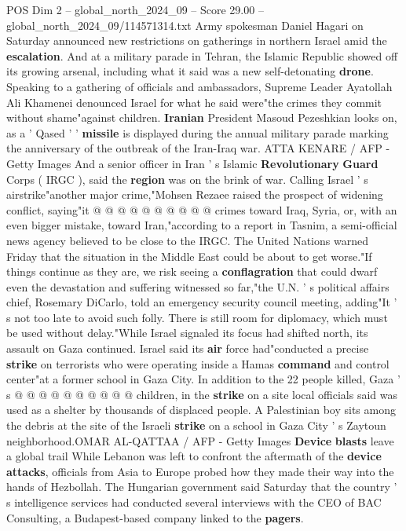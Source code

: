 \begin{textsample}{POS Dim 2 – global\_north\_2024\_09 – Score 29.00 – global\_north\_2024\_09/114571314.txt}
Army spokesman Daniel Hagari on Saturday announced new restrictions on gatherings in northern Israel amid the \textbf{escalation}.
And at a military parade in Tehran, the Islamic Republic showed off its growing arsenal, including what it said was a new self-detonating \textbf{drone}.
Speaking to a gathering of officials and ambassadors, Supreme Leader Ayatollah Ali Khamenei denounced Israel for what he said were"the crimes they commit without shame"against children. \textbf{Iranian} President Masoud Pezeshkian looks on, as a ' Qased ' ' \textbf{missile} is displayed during the annual military parade marking the anniversary of the outbreak of the Iran-Iraq war.
ATTA KENARE / AFP - Getty Images And a senior officer in Iran ' s Islamic \textbf{Revolutionary} \textbf{Guard} Corps ( IRGC ), said the \textbf{region} was on the brink of war.
Calling Israel ' s airstrike"another major crime,"Mohsen Rezaee raised the prospect of widening conflict, saying"it @ @ @ @ @ @ @ @ @ @ crimes toward Iraq, Syria, or, with an even bigger mistake, toward Iran,"according to a report in Tasnim, a semi-official news agency believed to be close to the IRGC.
The United Nations warned Friday that the situation in the Middle East could be about to get worse."If things continue as they are, we risk seeing a \textbf{conflagration} that could dwarf even the devastation and suffering witnessed so far,"the U.N. ' s political affairs chief, Rosemary DiCarlo, told an emergency security council meeting, adding"It ' s not too late to avoid such folly.
There is still room for diplomacy, which must be used without delay."While Israel signaled its focus had shifted north, its assault on Gaza continued.
Israel said its \textbf{air} force had"conducted a precise \textbf{strike} on terrorists who were operating inside a Hamas \textbf{command} and control center"at a former school in Gaza City.
In addition to the 22 people killed, Gaza ' s @ @ @ @ @ @ @ @ @ @ children, in the \textbf{strike} on a site local officials said was used as a shelter by thousands of displaced people.
A Palestinian boy sits among the debris at the site of the Israeli \textbf{strike} on a school in Gaza City ' s Zaytoun neighborhood.OMAR AL-QATTAA / AFP - Getty Images \textbf{Device} \textbf{blasts} leave a global trail While Lebanon was left to confront the aftermath of the \textbf{device} \textbf{attacks}, officials from Asia to Europe probed how they made their way into the hands of Hezbollah.
The Hungarian government said Saturday that the country ' s intelligence services had conducted several interviews with the CEO of BAC Consulting, a Budapest-based company linked to the \textbf{pagers}.

\end{textsample}
